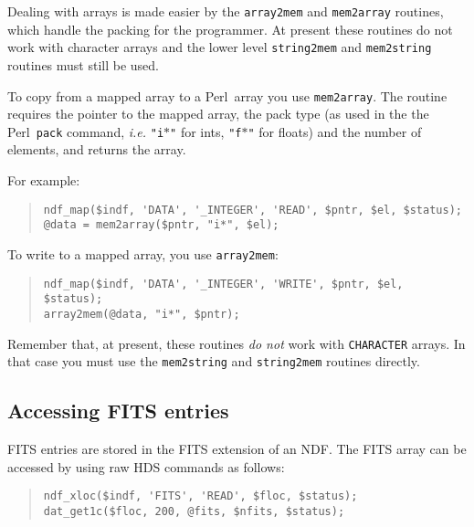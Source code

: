\documentclass[twoside,11pt]{article}
\newenvironment{myquote}{\begin{quote}\begin{small}}{\end{small}\end{quote}}
\newcommand{\perl}{\xref{\textsf{Perl}}{sun193}{}}
\newcommand{\xref}[3]{#1}
\newcommand{\xlabel}[1]{}
\renewcommand{\_}{\texttt{\symbol{95}}}
\begin{document}
Dealing with arrays is made easier by the \texttt{array2mem} and
\texttt{mem2array}  routines, which handle the packing for the
programmer. At present these routines do not work with character arrays
and the lower level \texttt{string2mem} and \texttt{mem2string}
routines must still be used.

To copy from a mapped array to a \perl\ array you use \texttt{mem2array}.
The routine requires the pointer to the mapped array, the pack type (as
used in the the \perl\ \texttt{pack} command, \emph{i.e.}
\texttt{"i$\ast$"} for ints, \texttt{"f$\ast$"} for floats) and the
number of elements, and returns the array.

For example:
\begin{myquote}
\begin{verbatim}
ndf_map($indf, 'DATA', '_INTEGER', 'READ', $pntr, $el, $status);
@data = mem2array($pntr, "i*", $el);
\end{verbatim}
\end{myquote}

To write to a mapped array, you use \texttt{array2mem}:

\begin{myquote}
\begin{verbatim}
ndf_map($indf, 'DATA', '_INTEGER', 'WRITE', $pntr, $el, $status);
array2mem(@data, "i*", $pntr);
\end{verbatim}
\end{myquote}

Remember that, at present, these routines \emph{do not\/} work with
\texttt{\_CHARACTER} arrays. In that case you must use the
\texttt{mem2string} and \texttt{string2mem} routines directly.

\subsection{\xlabel{accessing_fits_entries}Accessing FITS entries}%
\label{accessing_fits_entries}

FITS entries are stored in the FITS extension of an NDF. The FITS array
can be accessed by using raw HDS commands as follows:

\begin{myquote}
\begin{verbatim}
ndf_xloc($indf, 'FITS', 'READ', $floc, $status);
dat_get1c($floc, 200, @fits, $nfits, $status);
\end{verbatim}
\end{myquote}
\end{document}

